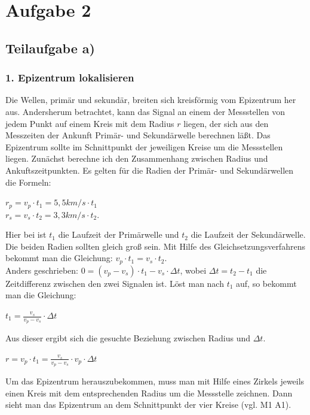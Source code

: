 \documentclass{article}
\begin{document}
\section*{Aufgabe 2}
\subsection*{Teilaufgabe a)}
\subsubsection*{1. Epizentrum lokalisieren}
Die Wellen, primär und sekundär, breiten sich kreisförmig vom Epizentrum her aus. Andersherum betrachtet, kann das Signal an einem der Messstellen von jedem Punkt auf einem Kreis mit dem Radius $r$ liegen, 
der sich aus den Messzeiten der Ankunft Primär- und Sekundärwelle berechnen läßt. 
Das Epizentrum sollte im Schnittpunkt der jeweiligen Kreise um die Messstellen liegen. 
Zunächst berechne ich den Zusammenhang zwischen Radius und Ankuftszeitpunkten. 
Es gelten für die Radien der Primär- und Sekundärwellen die Formeln: 
\begin{center}
	$r_{p} = v_p \cdot t_1 = 5,5 km/s \cdot t_1$ \\ 
	$r_{s} = v_s \cdot t_2 = 3,3 km/s \cdot t_2$.
\end{center}
Hier bei ist $t_1$ die Laufzeit der Primärwelle und $t_2$ die Laufzeit der Sekundärwelle.\\
Die beiden Radien sollten gleich groß sein. Mit Hilfe des Gleichsetzungsverfahrens bekommt man die Gleichung: 
\space \space $v_p \cdot t_1  = v_s \cdot t_2$.\\
Anders geschrieben: $0 = (v_p-v_s) \cdot t_1  - v_s \cdot \Delta t$, 
wobei $\Delta t = t_2- t_1$ die Zeitdifferenz zwischen den zwei Signalen ist. 
Löst man nach $t_1$ auf, so bekommt man die Gleichung:
\begin{center}
	\item $t_1 = \frac{v_s }{v_p - v_s}\cdot \Delta t$ 
\end{center}
Aus dieser ergibt sich die gesuchte Beziehung zwischen Radius und $\Delta t$. 
\begin{center}
	\item $r = v_p \cdot t_1 = \frac{v_s}{v_p - v_s} \cdot v_p \cdot \Delta t$
\end{center}
Um das Epizentrum herauszubekommen, muss man mit Hilfe eines Zirkels jeweils einen Kreis mit dem entsprechenden Radius um die Messstelle zeichnen. 
Dann sieht man das Epizentrum an dem Schnittpunkt der vier Kreise (vgl. M1 A1). 
\end{document}

